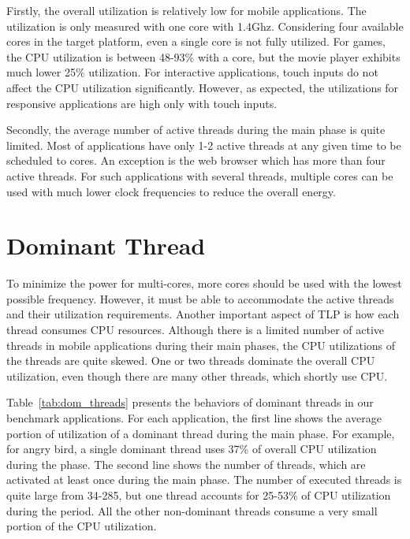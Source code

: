 Firstly, the overall utilization is relatively low for mobile applications. The utilization is
only measured with one core with 1.4Ghz. Considering four available cores in the target platform,
even a single core is not fully utilized. For games, the CPU utilization is between 48-93\%
with a core, but the movie player exhibits much lower 25\% utilization. For interactive
applications, touch inputs do not affect the CPU utilization significantly. However, as expected,
the utilizations for responsive applications are high only with touch inputs. 

Secondly, the average number of active threads during the main phase is quite limited. Most
of applications have only 1-2 active threads at any given time to be scheduled to cores. 
An exception is the web browser which has more than four active threads. For such applications
with several threads, multiple cores can be used with much lower clock frequencies to reduce
the overall energy.

\section{Dominant Thread}



To minimize the power for multi-cores, more cores should be used with the lowest possible frequency.
However, it must be able to accommodate the active threads and their utilization requirements. 
Another important aspect of TLP is how each thread consumes CPU resources. Although there is 
a limited number of active threads in mobile applications during their main phases, the CPU utilizations
of the threads are quite skewed. One or two threads dominate the overall CPU utilization, even though
there are many other threads, which shortly use CPU.

Table~\ref{tab:dom_threads} presents the behaviors of dominant threads in our benchmark applications.
For each application, the first line shows the average portion of utilization of a dominant thread during
the main phase. For example, for angry bird, a single dominant thread uses 37\% of overall CPU utilization 
during the phase. The second line shows the number of threads, which are activated at least once 
during the main phase. The number of
executed threads is quite large from 34-285, but one thread accounts for 25-53\% of CPU utilization during
the period. All the other non-dominant threads consume a very small portion of the CPU utilization.


